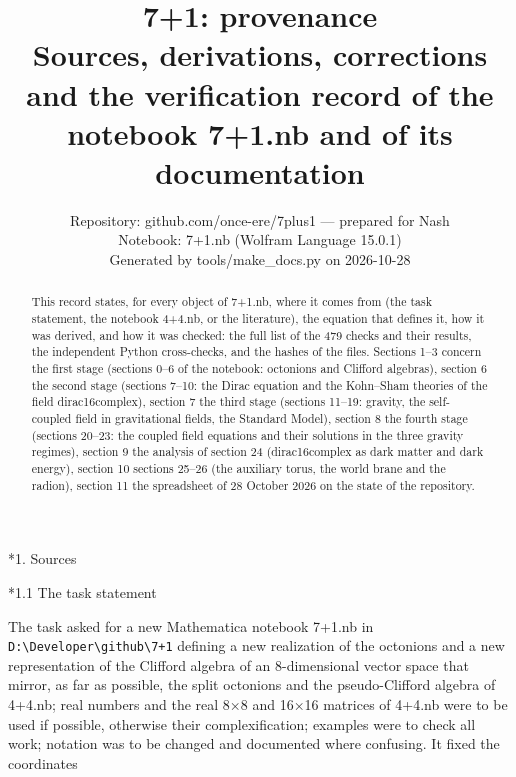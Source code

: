 \documentclass[10pt,a4paper]{article}
\makeatletter
\renewcommand\section{\@startsection{section}{1}{\z@}{-3.5ex \@plus -1ex \@minus -.2ex}{2.3ex \@plus.2ex}{\normalfont\Large\bfseries\raggedright}}
\renewcommand\subsection{\@startsection{subsection}{2}{\z@}{-3.25ex\@plus -1ex \@minus -.2ex}{1.5ex \@plus .2ex}{\normalfont\large\bfseries\raggedright}}
\makeatother
\begin{document}
\title{7+1: provenance\\[0.4em]\large Sources, derivations, corrections and the verification record of the notebook 7+1.nb and of its documentation}
\author{Repository: github.com/once-ere/7plus1 — prepared for Nash\\ Notebook: 7+1.nb (Wolfram Language 15.0.1)\\ Generated by tools/make\_docs.py on 2026-10-28}
\date{}
\maketitle
\begin{abstract}
This record states, for every object of 7+1.nb, where it comes from (the task statement, the notebook 4+4.nb, or the literature), the equation that defines it, how it was derived, and how it was checked: the full list of the 479 checks and their results, the independent Python cross-checks, and the hashes of the files. Sections 1–3 concern the first stage (sections 0–6 of the notebook: octonions and Clifford algebras), section 6 the second stage (sections 7–10: the Dirac equation and the Kohn–Sham theories of the field dirac16complex), section 7 the third stage (sections 11–19: gravity, the self-coupled field in gravitational fields, the Standard Model), section 8 the fourth stage (sections 20–23: the coupled field equations and their solutions in the three gravity regimes), section 9 the analysis of section 24 (dirac16complex as dark matter and dark energy), section 10 sections 25–26 (the auxiliary torus, the world brane and the radion), section 11 the spreadsheet of 28 October 2026 on the state of the repository.
\end{abstract}
\tableofcontents
{}\section*{1. Sources}
\subsection*{1.1 The task statement}
The task asked for a new Mathematica notebook 7+1.nb in \texttt{D:\textbackslash{}\allowbreak{}Developer\textbackslash{}\allowbreak{}github\textbackslash{}\allowbreak{}7+1} defining a new realization of the octonions and a new representation of the Clifford algebra of an 8-dimensional vector space that mirror, as far as possible, the split octonions and the pseudo-Clifford algebra of 4+4.nb; real numbers and the real 8×8 and 16×16 matrices of 4+4.nb were to be used if possible, otherwise their complexification; examples were to check all work; notation was to be changed and documented where confusing. It fixed the coordinates
\end{document}
